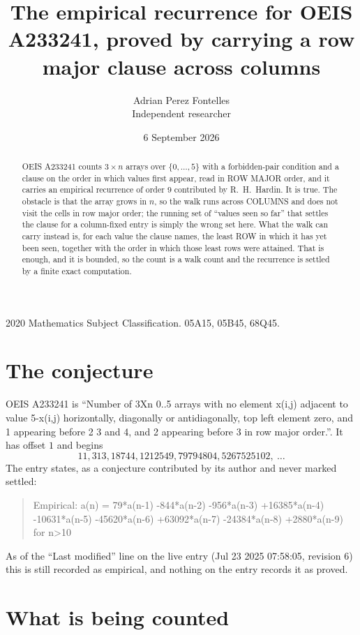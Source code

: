 \documentclass[11pt,a4paper]{article}
\title{The empirical recurrence for OEIS A233241, proved by carrying a row major clause across
columns}
\author{Adrian Perez Fontelles\\ \small Independent researcher}
\date{6 September 2026}
\theoremstyle{plain}
\theoremstyle{definition}
\begin{document}
\maketitle

\begin{abstract}
OEIS A233241 counts $3\times n$ arrays over $\{0,\dots,5\}$ with a forbidden-pair
condition and a clause on the order in which values first appear, read in ROW MAJOR order, and
it carries an empirical recurrence of order $9$ contributed by R.~H.~Hardin. It is true.
The obstacle is that the array grows in $n$, so the walk runs across COLUMNS and does not visit
the cells in row major order; the running set of ``values seen so far'' that settles the clause
for a column-fixed entry is simply the wrong set here. What the walk can carry instead is, for
each value the clause names, the least ROW in which it has yet been seen, together with the
order in which those least rows were attained. That is enough, and it is bounded, so the count
is a walk count and the recurrence is settled by a finite exact computation.
\end{abstract}

\noindent\small 2020 Mathematics Subject Classification. 05A15, 05B45, 68Q45.\normalsize

\section{The conjecture}

OEIS A233241 is ``Number of 3Xn 0..5 arrays with no element x(i,j) adjacent to value 5-x(i,j) horizontally, diagonally or antidiagonally, top left element zero, and 1 appearing before 2 3 and 4, and 2 appearing before 3 in row major order.''. It has offset $1$ and begins
\[
11, 313, 18744, 1212549, 79794804, 5267525102,\ \dots
\]
The entry states, as a conjecture contributed by its author and never marked settled:
\begin{quote}
Empirical: a(n) = 79*a(n-1) -844*a(n-2) -956*a(n-3) +16385*a(n-4) -10631*a(n-5) -45620*a(n-6) +63092*a(n-7) -24384*a(n-8) +2880*a(n-9) for n>10
\end{quote}
As of the ``Last modified'' line on the live entry (Jul 23 2025 07:58:05, revision 6) this is still
recorded as empirical, and nothing on the entry records it as proved.

\section{What is being counted}
\end{document}
